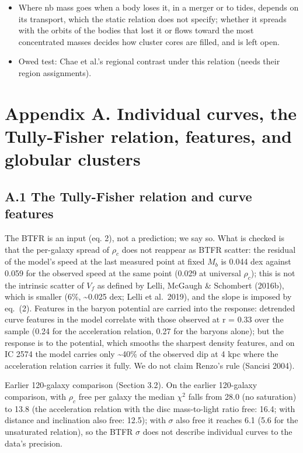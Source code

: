 \documentclass[
  10pt,
]{article}
\begin{document}
\begin{itemize}
\item Where nb mass goes when a body loses it, in a merger or to tides, depends on its transport, which the static relation does not specify; whether it spreads with the orbits of the bodies that lost it or flows toward the most concentrated masses decides how cluster cores are filled, and is left open.
\item Owed test: Chae et al.'s regional contrast under this relation (needs their region assignments).
\end{itemize}


\section{Appendix A. Individual curves, the Tully-Fisher relation, features, and globular clusters}\label{appendix-a.-individual-curves-the-tully-fisher-relation-features-and-globular-clusters}

\subsection{A.1 The Tully-Fisher relation and curve features}\label{the-tully-fisher-relation-and-curve-features}

The BTFR is an input (eq. 2), not a prediction; we say so. What is
checked is that the per-galaxy spread of $\rho_c$ does not reappear as
BTFR scatter: the residual of the model's speed at the last measured point at fixed $M_b$ is 0.044 dex against 0.059 for the observed speed at the same point (0.029 at universal $\rho_c$); this is not the intrinsic scatter of $V_f$ as defined by Lelli, McGaugh \& Schombert (2016b), which is smaller (6\%, \textasciitilde{}0.025 dex; Lelli et al.~2019), and the slope is imposed by eq.~(2). Features in the baryon potential are
carried into the response: detrended curve features in the model
correlate with those observed at r = 0.33 over the sample (0.24 for the
acceleration relation, 0.27 for the baryons alone); but the response is
to the potential, which smooths the sharpest density features, and on IC
2574 the model carries only \textasciitilde{}40\% of the observed dip at 4
kpc where the acceleration relation carries it fully. We do not claim
Renzo's rule (Sancisi 2004).

Earlier 120-galaxy comparison (Section 3.2). On the earlier 120-galaxy comparison, with $\rho_c$ free per galaxy the median $\chi^2$ falls from 28.0 (no saturation) to 13.8 (the acceleration relation with the disc mass-to-light ratio free: 16.4; with distance and inclination also free: 12.5); with $\sigma$ also free it reaches 6.1 (5.6 for the unsaturated relation), so the BTFR $\sigma$ does not describe individual curves to the data's precision.
\end{document}
